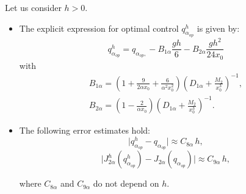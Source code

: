 \documentclass[axioms,article,submit,moreauthors]{Definitions/mdpi}
\begin{document}
\begin{Lemma} Let us consider $h>0.$
    
     \begin{itemize}
      \item[(a)]  The explicit expression for optimal control ${q^h_{\alpha_{op}}} $ is given by:     
     \begin{equation}\label{qhalphaop}
      { q^h_{\alpha_{op}}} = q_{\alpha_{op},}-B_{1\alpha}\frac{gh}{6}-B_{2\alpha}\frac{g h^2}{24 x_0} 
     \end{equation}
     with   \[\begin{array}{cc}
     B_{1\alpha}=\left(1+\tfrac{9}{2\alpha x_0}+\tfrac{6}{\alpha^2 x_0^2}\right) \left(D_{1\alpha}+\tfrac{M_2}{x_0^3} \right)^{-1},\\[0.45cm]
      B_{2\alpha}=\left(1-\tfrac{2}{\alpha x_0}\right) \left(D_{1\alpha}+\tfrac{M_2}{x_0^3} \right)^{-1}.\end{array}\]
     
     \noindent 
     
      \item[(b)]The following error estimates hold:
     		\begin{equation}\label{qhalphaop-qalphaop}
     		\lvert { q^h_{\alpha_{op}}} - q_{\alpha_{op}} \rvert \approx C_{8\alpha} \, h ,
     		\end{equation}
     		\begin{equation}\label{J2halpha qhalphaop-J2alpha qalphaop}
     	    \Big \lvert  { J^h_{2 \alpha}}({ q^h_{\alpha_{op}}}) -  J_{2\alpha}(q_{\alpha_{op}}) \Big \rvert \approx C_{9\alpha} \, h,
     	    \end{equation}
     		     		
    		
        where $C_{8\alpha}$  and $C_{9\alpha}$  do not depend on $h$.
     
     \end{itemize}
    \end{Lemma}
\end{document}
